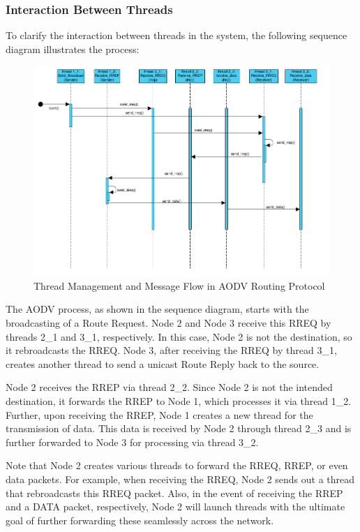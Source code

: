 \documentclass[]{nsm-thesis}
\begin{document}
\subsubsection{Interaction Between Threads}
To clarify the interaction between threads in the system, the following sequence diagram illustrates the process:

\begin{figure}[h]
\graphicspath{{/image/}} %
\centering
\includegraphics[scale=0.3]{image/sequencediagramm.png} %
\caption{Thread Management and Message Flow in AODV Routing Protocol}
\label{fig:mesh9} %
\end{figure}

The AODV process, as shown in the sequence diagram, starts with the broadcasting of a Route Request. Node 2 and Node 3 receive this RREQ by threads 2\_1 and 3\_1, respectively. In this case, Node 2 is not the destination, so it rebroadcasts the RREQ. Node 3, after receiving the RREQ by thread 3\_1, creates another thread to send a unicast Route Reply back to the source.

Node 2 receives the RREP via thread 2\_2. Since Node 2 is not the intended destination, it forwards the RREP to Node 1, which processes it via thread 1\_2. Further, upon receiving the RREP, Node 1 creates a new thread for the transmission of data. This data is received by Node 2 through thread 2\_3 and is further forwarded to Node 3 for processing via thread 3\_2.

Note that Node 2 creates various threads to forward the RREQ, RREP, or even data packets. For example, when receiving the RREQ, Node 2 sends out a thread that rebroadcasts this RREQ packet. Also, in the event of receiving the RREP and a DATA packet, respectively, Node 2 will launch threads with the ultimate goal of further forwarding these seamlessly across the network.
\end{document}

